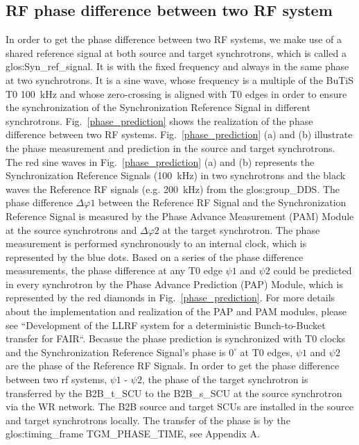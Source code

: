 \subsection{RF phase difference between two RF system}
In order to get the phase difference between two RF systems, we make use of a shared reference signal at both source and target synchrotrons, which is called a \gls{glos:Syn_ref_signal}. It is with the fixed frequency and always in the same phase at two synchrotrons. It is a sine wave, whose frequency is a multiple of the BuTiS T0 \SI{100}{kHz} and whose zero-crossing is aligned with T0 edges in order to ensure the synchronization of the Synchronization Reference Signal in different synchrotrons. Fig.~\ref{phase_prediction} shows the realization of the phase difference between two RF systems. Fig.~\ref{phase_prediction} (a) and (b) illustrate the phase measurement and prediction in the source and target synchrotrons. The red sine waves in Fig.~\ref{phase_prediction} (a) and (b) represents the Synchronization Reference Signals (\SI{100}{kHz}) in two synchrotrons and the black waves the Reference RF signals (e.g. \SI{200}{kHz}) from the \gls{glos:group_DDS}. The phase difference $\Delta \varphi1$ between the Reference RF Signal and the Synchronization Reference Signal is measured by the Phase Advance Measurement (\gls{PAM}) Module at the source synchrotrons and $\Delta \varphi2$ at the target synchrotron. The phase measurement is performed synchronously to an internal clock, which is represented by the blue dots. Based on a series of the phase difference measurements, the phase difference at any T0 edge $\psi1$ and $\psi2$ could be predicted in every synchrotron by the Phase Advance Prediction (\gls{PAP}) Module, which is represented by the red diamonds in Fig.~\ref{phase_prediction}. For more details about the implementation and realization of the PAP and PAM modules, please see ``Development of the LLRF system for a deterministic Bunch-to-Bucket transfer for FAIR``. Becasue the phase prediction is synchronized with T0 clocks and the Synchronization Reference Signal's phase is $0^\circ$ at T0 edges, $\psi1$ and $\psi2$ are the phase of the Reference RF Signals. In order to get the phase difference between two rf systems, $\psi1$ - $\psi2$, the phase of the target synchrotron is transferred by the \gls{B2B_t_SCU} to the \gls{B2B_s_SCU} at the source synchrotron via the WR network. The B2B source and target SCUs are installed in the source and target synchrotrons locally. The transfer of the phase is by the \gls{glos:timing_frame} TGM\_PHASE\_TIME, see Appendix A.

